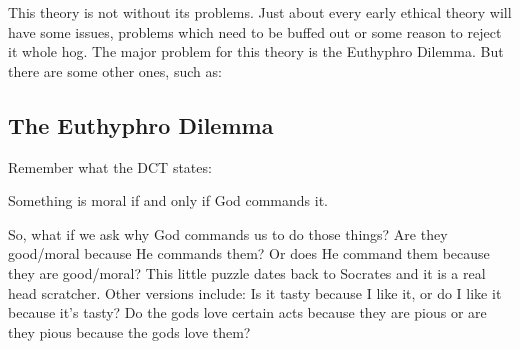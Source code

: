 This theory is not without its problems. Just about every early ethical theory will have some issues, problems which need to be buffed out or some reason to reject it whole hog. The major problem for this theory is the Euthyphro Dilemma.  But there are some other ones, such as:




\subsection{The Euthyphro Dilemma}

Remember what the DCT states:

\begin{center}
\noindent Something is moral if and only if God commands it.
\end{center}

So, what if we ask why God commands us to do those things? Are they good/moral because He commands them? Or does He command them because they are good/moral? This little puzzle dates back to Socrates and it is a real head scratcher. Other versions include: Is it tasty because I like it, or do I like it because it’s tasty? Do the gods love certain acts because they are pious or are they pious because the gods love them?

